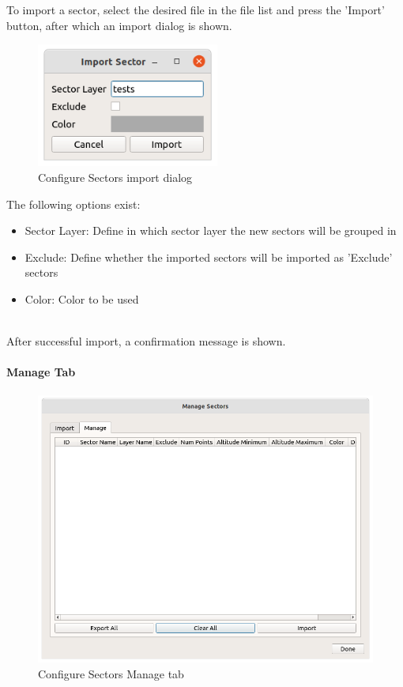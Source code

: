 To import a sector, select the desired file in the file list and press the 'Import' button, after which an import dialog is shown. \\

\begin{figure}[H]
    \includegraphics[width=6cm]{figures/configure_sectors_import_dialog.png}
  \caption{Configure Sectors import dialog}
\end{figure}

The following options exist:
\begin{itemize}
\item Sector Layer: Define in which sector layer the new sectors will be grouped in
\item Exclude: Define whether the imported sectors will be imported as 'Exclude' sectors
\item Color: Color to be used
\end{itemize}
\ \\

After successful import, a confirmation message is shown. \\

\paragraph {Manage Tab}
\label{sec:ui_configure_sectors_manage}

\begin{figure}[H]
    \includegraphics[width=15cm]{figures/configure_sectors_manage.png}
  \caption{Configure Sectors Manage tab}
\end{figure}

